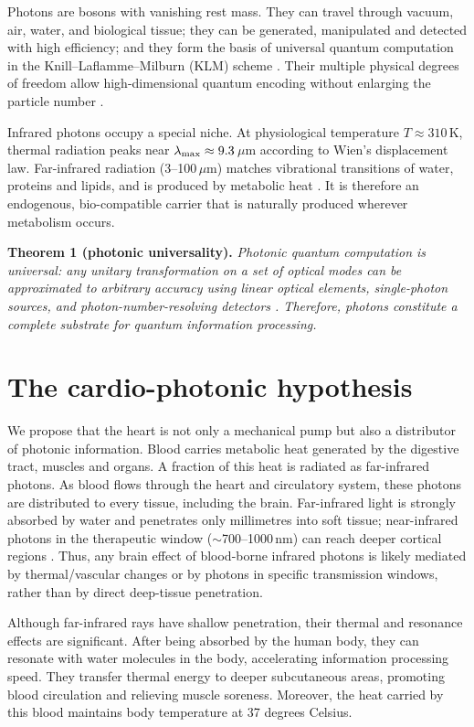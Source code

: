 \documentclass[11pt,a4paper]{article}
\begin{document}
Photons are bosons with vanishing rest mass. They can travel through vacuum, air, water, and biological tissue; they can be generated, manipulated and detected with high efficiency; and they form the basis of universal quantum computation in the Knill--Laflamme--Milburn (KLM) scheme \cite{knill2001,kok2007}. Their multiple physical degrees of freedom allow high-dimensional quantum encoding without enlarging the particle number \cite{erhard2020,flamini2019}.

Infrared photons occupy a special niche. At physiological temperature $T\approx310$\,K, thermal radiation peaks near $\lambda_{\rm max}\approx 9.3$\,$\mu$m according to Wien's displacement law. Far-infrared radiation (3--100\,$\mu$m) matches vibrational transitions of water, proteins and lipids, and is produced by metabolic heat \cite{shui2015,inagaki2021}. It is therefore an endogenous, bio-compatible carrier that is naturally produced wherever metabolism occurs.

\textbf{Theorem 1 (photonic universality).} \textit{Photonic quantum computation is universal: any unitary transformation on a set of optical modes can be approximated to arbitrary accuracy using linear optical elements, single-photon sources, and photon-number-resolving detectors \cite{knill2001,kok2007}. Therefore, photons constitute a complete substrate for quantum information processing.}

\section*{The cardio-photonic hypothesis}

We propose that the heart is not only a mechanical pump but also a distributor of photonic information. Blood carries metabolic heat generated by the digestive tract, muscles and organs. A fraction of this heat is radiated as far-infrared photons. As blood flows through the heart and circulatory system, these photons are distributed to every tissue, including the brain. Far-infrared light is strongly absorbed by water and penetrates only millimetres into soft tissue; near-infrared photons in the therapeutic window ($\sim$700--1000\,nm) can reach deeper cortical regions \cite{wells2005,cayce2011}. Thus, any brain effect of blood-borne infrared photons is likely mediated by thermal/vascular changes or by photons in specific transmission windows, rather than by direct deep-tissue penetration.

Although far-infrared rays have shallow penetration, their thermal and resonance effects are significant. After being absorbed by the human body, they can resonate with water molecules in the body, accelerating information processing speed. They transfer thermal energy to deeper subcutaneous areas, promoting blood circulation and relieving muscle soreness. Moreover, the heat carried by this blood maintains body temperature at 37 degrees Celsius.
\end{document}
